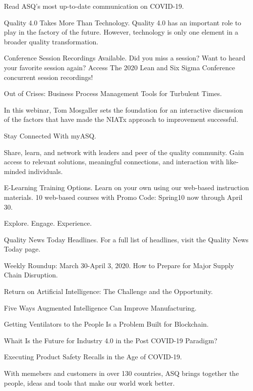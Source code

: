 Read ASQ's most up-to-date communication
on COVID-19.

\fi

Quality 4.0 Takes More Than Technology.
Quality 4.0 has an important role to
play in the factory of the future.
However, technology is only one element
in a broader quality transformation.

\fi

Conference Session Recordings Available.
Did you miss a session? Want to heard
your favorite session again?
Access The 2020 Lean and Six Sigma
Conference concurrent session
recordings!

Out of Crises: Business Process
Management Tools for Turbulent Times.

In this webinar, Tom Mosgaller sets the
foundation for an interactive
discussion of the factors that have made
the NIATx approach to improvement
successful.

Stay Connected With myASQ.

Share, learn, and network with leaders
and peer of the quality community.
Gain access to relevant solutions,
meaningful connections, and
interaction with like-minded individuals.

E-Learning Training Options.
Learn on your own using our web-based
instruction materials. 10%
web-based courses with Promo Code:
Spring10 now through April 30.

\fi

Explore. Engage. Experience.

\fi

Quality News Today Headlines.
For a full list of headlines, visit
the Quality News Today page.

\fi

Weekly Roundup: March 30-April 3, 2020.
How to Prepare for Major Supply Chain
Disruption.

Return on Artificial Intelligence: The
Challenge and the Opportunity.

Five Ways Augmented Intelligence Can
Improve Manufacturing.

Getting Ventilators to the People
Is a Problem Built for Blockchain.

Whait Is the Future for Industry 4.0
in the Post COVID-19 Paradigm?

Executing Product Safety Recalls
in the Age of COVID-19.

With memebers and customers in over 130
countries, ASQ brings together the
people, ideas and tools that make our
world work better.

